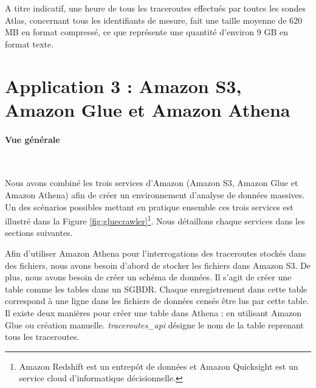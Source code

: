  A titre indicatif, une heure de tous les traceroutes effectués par toutes les sondes Atlas, concernant tous les identifiants de mesure,  fait une taille moyenne de  $620$ MB en format compressé, ce que représente une quantité d'environ $9$ GB en format texte.

\section{Application 3 : Amazon S3, Amazon Glue  et Amazon Athena }

\paragraph{Vue générale}~

Nous avons combiné les trois services d'Amazon (Amazon S3, Amazon Glue  et Amazon Athena)  afin de créer un environnement d'analyse de données massives. 
Un des scénarios possibles mettant en pratique ensemble ces trois services est illustré dans la Figure
\ref{fig:gluecrawler}\footnote{Amazon Redshift  est un entrepôt de données et  Amazon Quicksight  est un service cloud d'informatique décisionnelle.}. Nous détaillons chaque services dans les sections suivantes.

Afin d'utiliser Amazon Athena pour l'interrogations des traceroutes stockés dans des fichiers, nous avons besoin d'abord de stocker les fichiers dans Amazon S3. De plus, nous avons besoin de créer un  schéma de données. Il s'agit de créer une table comme les tables dans un SGBDR. Chaque enregistrement dans cette table correspond à une ligne dans les fichiers de données censés être lus par cette table. Il existe deux manières pour créer une table dans Athena : en utilisant Amazon Glue ou création manuelle. \textit{traceroutes\_api} désigne le nom de la table reprenant tous les traceroutes.

